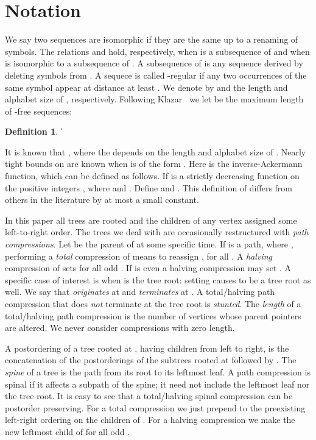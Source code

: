 \documentclass{article}
\newtheorem{definition}[theorem]{Definition}
\begin{document}
\section{Notation}\label{sect:not}

We say two sequences are isomorphic if they are the same up to a renaming of symbols.
The relations  and  hold, respectively,
when  is a subsequence of  and when  is isomorphic to a subsequence
of .  A subsequence of  is any sequence derived by deleting symbols from .
A sequece  is called -regular if any two occurrences of the same symbol appear at distance at least .
We denote by  and  the length and alphabet size of , respectively.
Following Klazar~\cite{Klazar02} we let  be the maximum length of -free sequences:

\begin{definition}
\|\sigma\|
\end{definition}

It is known \cite{Klazar92} that , where the  depends on the length
and alphabet size of .  Nearly tight bounds on  are known \cite{ASS89} when
 is of the form .
Here  is the inverse-Ackermann function, which can be defined as follows.
If  is a strictly decreasing function on the positive integers 
, where  and .
Define 
and .  This definition of  differs from others in the literature \cite{Tar75,HS86}
by at most a small constant.

In this paper all trees are rooted and the children of any vertex assigned some left-to-right order.
The trees we deal with are occasionally restructured with {\em path compressions}. 
Let  be the parent of  at some specific time.  If  is a path,
where , performing a {\em total} compression of  means to reassign
, for all .  A {\em halving} compression of  sets
 for all odd .  If  is even a halving compression may set
.  A specific case of interest is when  is the tree root:
setting  causes  to be a tree root as well.
We say that  {\em originates} at  and {\em terminates} at .
A total/halving path compression that does {\em not} terminate at the tree root is {\em stunted}.
The {\em length} of a total/halving path compression is the number of vertices whose
parent pointers are altered.  We never consider compressions with zero length.

A postordering of a tree rooted at , having
children  from left to right, is the concatenation of the postorderings of
the subtrees rooted at  followed by .  The {\em spine} of a tree is the path from
its root to its leftmost leaf.  A path compression is spinal if it affects a subpath of the spine; it need
not include the leftmost leaf nor the tree root.  It is easy to see that a total/halving spinal compression
can be postorder preserving.  For a total compression  we just prepend 
to the preexisting left-right ordering on the children of .  For a halving compression we make  the new leftmost child
of  for all odd .
\end{document}
